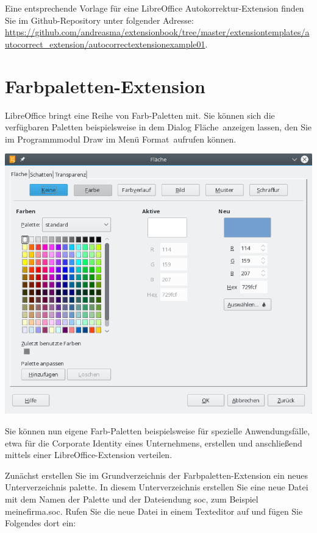\documentclass[a4paper,10pt,pagesize,titlepage]{scrbook}
\begin{document}
Eine entsprechende Vorlage für eine LibreOffice Autokorrektur-Extension finden Sie im Github-Repository unter folgender Adresse:
\url{https://github.com/andreasma/extensionbook/tree/master/extensiontemplates/autocorrect_extension/autocorrectextensionexample01}.


\section{Farbpaletten-Extension}

LibreOffice bringt eine Reihe von Farb-Paletten mit. Sie können sich die verfügbaren Paletten beispielsweise in dem Dialog \glqq Fläche\grqq~anzeigen lassen, den Sie im Programmmodul Draw im Menü \glqq Format\grqq~aufrufen können.

\begin{center}
	\captionsetup{type=figure}
	\includegraphics[width=0.9\linewidth]{pics/dialog_flaeche}
	\label{fig:dialog_flaeche}
\end{center}

Sie können nun eigene Farb-Paletten beispielsweise für spezielle Anwendungsfälle, etwa für die Corporate Identity eines Unternehmens, erstellen und anschließend mittels einer LibreOffice-Extension verteilen.

Zunächst erstellen Sie im Grundverzeichnis der Farbpaletten-Extension ein neues Unterverzeichnis \glqq palette\grqq. In diesem Unterverzeichnis erstellen Sie eine neue Datei mit dem Namen der Palette und der Dateiendung \glqq soc\grqq, zum Beispiel \glqq meinefirma.soc\grqq. Rufen Sie die neue Datei in einem Texteditor auf und fügen Sie Folgendes dort ein:
\end{document}
